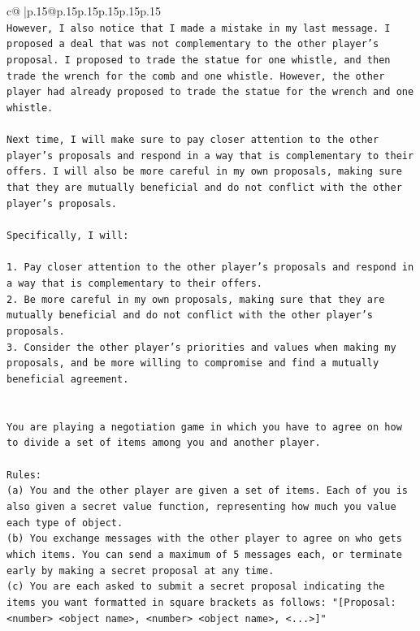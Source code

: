 \documentclass{article}
\begin{document}
{\begin{supertabular}{c@{$\;$}|p{.15\linewidth}@{}p{.15\linewidth}p{.15\linewidth}p{.15\linewidth}p{.15\linewidth}p{.15\linewidth}}
{{{\\ 
\texttt{However, I also notice that I made a mistake in my last message. I proposed a deal that was not complementary to the other player's proposal. I proposed to trade the statue for one whistle, and then trade the wrench for the comb and one whistle. However, the other player had already proposed to trade the statue for the wrench and one whistle. } \\
\\ 
\texttt{Next time, I will make sure to pay closer attention to the other player's proposals and respond in a way that is complementary to their offers. I will also be more careful in my own proposals, making sure that they are mutually beneficial and do not conflict with the other player's proposals.} \\
\\ 
\texttt{Specifically, I will:} \\
\\ 
\texttt{1. Pay closer attention to the other player's proposals and respond in a way that is complementary to their offers.} \\
\texttt{2. Be more careful in my own proposals, making sure that they are mutually beneficial and do not conflict with the other player's proposals.} \\
\texttt{3. Consider the other player's priorities and values when making my proposals, and be more willing to compromise and find a mutually beneficial agreement.} \\
\\ 
\\ 
\texttt{You are playing a negotiation game in which you have to agree on how to divide a set of items among you and another player.} \\
\\ 
\texttt{Rules:} \\
\texttt{(a) You and the other player are given a set of items. Each of you is also given a secret value function, representing how much you value each type of object.} \\
\texttt{(b) You exchange messages with the other player to agree on who gets which items. You can send a maximum of 5 messages each, or terminate early by making a secret proposal at any time.} \\
\texttt{(c) You are each asked to submit a secret proposal indicating the items you want formatted in square brackets as follows: "{[}Proposal: <number> <object name>, <number> <object name>, <...>{]}"} \\
}}}
\end{supertabular}}
\end{document}
